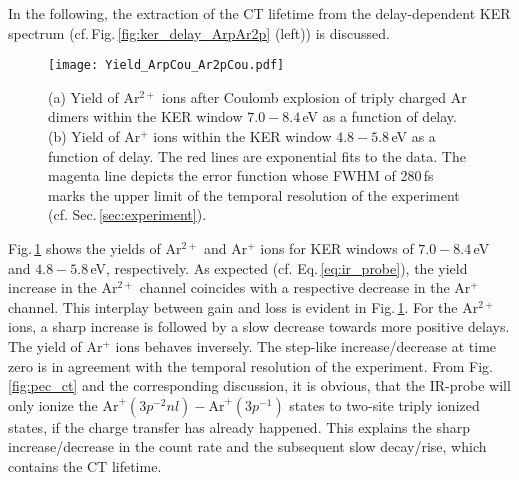 \documentclass[%
 aip,
rsi,%
 amsmath,amssymb,
preprint,%
]{revtex4-1}
\newcommand{\tsveta}[1]{\color{blue}{#1}}
\begin{document}
In the following, the extraction of the CT lifetime from the delay-dependent KER spectrum (cf.\,Fig.\,\ref{fig:ker_delay_ArpAr2p} (left)) is discussed. 
%
\begin{figure}
\texttt{[image: Yield\_ArpCou\_Ar2pCou.pdf]}%
\caption{(a) Yield of Ar$^{2+}$ ions after Coulomb explosion of triply charged Ar dimers within the KER window $7.0-8.4$\,eV as a function of delay. (b) Yield of Ar$^{+}$ ions within the KER window $4.8-5.8$\,eV as a function of \tsveta{pump-probe} delay. The red lines are exponential fits to the data. The magenta line depicts the error function whose FWHM of 280\,fs marks the upper limit of the temporal resolution of the experiment (cf. Sec.\,\ref{sec:experiment}).}
	\label{fig:probe_ccct}
\end{figure}
%
Fig.\,\ref{fig:probe_ccct} shows the yields of Ar$^{2+}$ and Ar$^+$ ions for KER windows of $7.0-8.4$\,eV and $4.8-5.8$\,eV, respectively. As expected (cf. Eq.\,\ref{eq:ir_probe}), the yield increase in the Ar$^{2+}$ channel coincides with a respective decrease in the Ar$^+$ channel. This interplay between gain and loss is evident in Fig.\,\ref{fig:probe_ccct}. For the Ar$^{2+}$ ions, a sharp increase is followed by a slow decrease towards more positive delays. The yield of Ar$^+$ ions behaves inversely. The step-like increase/decrease at time zero is in agreement with the temporal resolution of the experiment. From Fig.\,\ref{fig:pec_ct} and the corresponding discussion, it is obvious, that the IR-probe will only ionize the $\mathrm{Ar}^+(3p^{-2}nl)-\mathrm{Ar}^+(3p^{-1})$ states to two-site triply ionized states, if the charge transfer has already happened. This explains the sharp increase/decrease in the count rate and the subsequent slow decay/rise, which contains the CT lifetime. 
\end{document}
